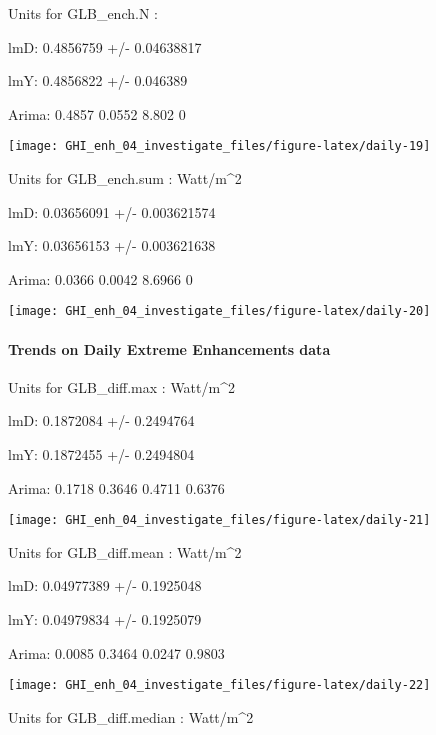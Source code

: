 \documentclass[
  10pt,
  a4paper,oneside]{article}
\begin{document}
Units for GLB\_ench.N :

lmD: 0.4856759 +/- 0.04638817

lmY: 0.4856822 +/- 0.046389

Arima: 0.4857 0.0552 8.802 0

\begin{center}\texttt{[image: GHI\_enh\_04\_investigate\_files/figure-latex/daily-19]} \end{center}

Units for GLB\_ench.sum : Watt/m\^{}2

lmD: 0.03656091 +/- 0.003621574

lmY: 0.03656153 +/- 0.003621638

Arima: 0.0366 0.0042 8.6966 0

\begin{center}\texttt{[image: GHI\_enh\_04\_investigate\_files/figure-latex/daily-20]} \end{center}

\newpage

\hypertarget{trends-on-daily-extreme-enhancements-data}{%
\paragraph{Trends on Daily Extreme Enhancements data}\label{trends-on-daily-extreme-enhancements-data}}

Units for GLB\_diff.max : Watt/m\^{}2

lmD: 0.1872084 +/- 0.2494764

lmY: 0.1872455 +/- 0.2494804

Arima: 0.1718 0.3646 0.4711 0.6376

\begin{center}\texttt{[image: GHI\_enh\_04\_investigate\_files/figure-latex/daily-21]} \end{center}

Units for GLB\_diff.mean : Watt/m\^{}2

lmD: 0.04977389 +/- 0.1925048

lmY: 0.04979834 +/- 0.1925079

Arima: 0.0085 0.3464 0.0247 0.9803

\begin{center}\texttt{[image: GHI\_enh\_04\_investigate\_files/figure-latex/daily-22]} \end{center}

Units for GLB\_diff.median : Watt/m\^{}2
\end{document}
